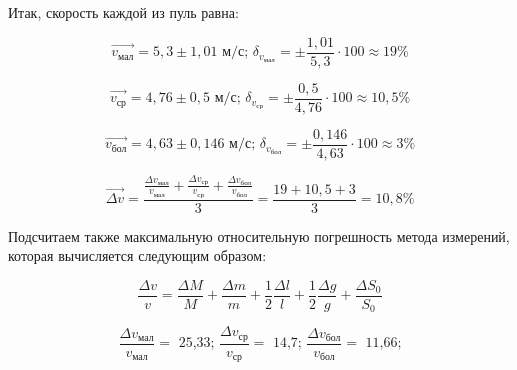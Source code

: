 Итак, скорость каждой из пуль равна:

\begin{equation*} 
        \vec{v_\text{мал}} = 5,3 \pm 1,01 \text{ м/с; }
        \delta_{v_\text{мал}} = \pm \frac{1,01}{5,3} \cdot 100 \approx 19 \%
\end{equation*}

\begin{equation*} 
        \vec{v_\text{ср}} = 4,76 \pm 0,5 \text{ м/с; }
        \delta_{v_\text{ср}} = \pm\frac{0,5}{4,76}\cdot 100 \approx 10,5 \%
\end{equation*}

\begin{equation*} 
        \vec{v_\text{бол}} = 4,63 \pm 0,146 \text{ м/с; }
        \delta_{v_\text{бол}} =\pm\frac{0,146}{4,63}\cdot 100 \approx 3 \%
\end{equation*}

\begin{equation*}
        \vec{\Delta v} =
        \frac{\frac{\Delta v_\text{мал}}{v_\text{мал}} + 
        \frac{\Delta v_\text{ср}}{v_\text{ср}} + 
        \frac{\Delta v_\text{бол}}{v_\text{бол}}}{3} = 
        \frac{19 + 10,5 + 3}{3} = 10,8 \%
\end{equation*}

Подсчитаем также максимальную относительную погрешность метода измерений, которая вычисляется следующим образом:

\begin{equation*}
        \frac{\Delta v}{v}=\frac{\Delta M}{M}+\frac{\Delta m}{m}+\frac{1}{2}\frac{\Delta l}{l}+\frac{1}{2}\frac{\Delta g}{g}+\frac{\Delta S_0}{S_0}
\end{equation*}

\begin{equation*} 
        \frac{\Delta v_\text{мал}}{v_\text{мал}} = \text{ 25,33; }
        \frac{\Delta v_\text{ср}}{v_\text{ср}} = \text{ 14,7; }
        \frac{\Delta v_\text{бол}}{v_\text{бол}} = \text{ 11,66;}
\end{equation*} 
